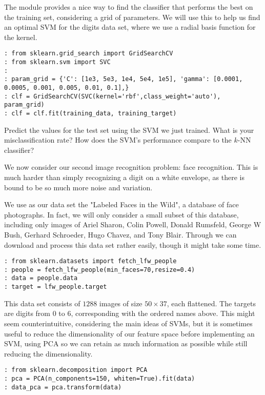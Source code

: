 The module  provides a nice way to find the classifier that performs the best on the training set, considering a grid of parameters. We will use this to help us find an optimal SVM for the digits data set, where we use a radial basis function for the kernel.
\begin{lstlisting}
: from sklearn.grid_search import GridSearchCV
: from sklearn.svm import SVC
:
: param_grid = {'C': [1e3, 5e3, 1e4, 5e4, 1e5], 'gamma': [0.0001, 0.0005, 0.001, 0.005, 0.01, 0.1],}
: clf = GridSearchCV(SVC(kernel='rbf',class_weight='auto'), param_grid)
: clf = clf.fit(training_data, training_target)
\end{lstlisting}

\begin{problem}
Predict the values for the test set using the SVM we just trained. What is your misclassification rate? How does the SVM's performance compare to the $k$-NN classifier?
\end{problem}

We now consider our second image recognition problem: face recognition. This is much harder than simply recognizing a digit on a white envelope, as there is bound to be so much more noise and variation.

We use as our data set the "Labeled Faces in the Wild", a database of face photographs. In fact, we will only consider a small subset of this database, including only images of Ariel Sharon, Colin Powell, Donald Rumsfeld, George W Bush, Gerhard Schroeder, Hugo Chavez, and Tony Blair. Through  we can download and process this data set rather easily, though it might take some time.
\begin{lstlisting}
: from sklearn.datasets import fetch_lfw_people
: people = fetch_lfw_people(min_faces=70,resize=0.4)
: data = people.data
: target = lfw_people.target
\end{lstlisting}

This data set consists of $1288$ images of size $50 \times 37$, each flattened. The targets are digits from $0$ to $6$, corresponding with the ordered names above. This might seem counterintuitive, considering the main ideas of SVMs, but it is sometimes useful to reduce the dimensionality of our feature space before implementing an SVM, using PCA so we can retain as much information as possible while still reducing the dimensionality.
\begin{lstlisting}
: from sklearn.decomposition import PCA
: pca = PCA(n_components=150, whiten=True).fit(data)
: data_pca = pca.transform(data)
\end{lstlisting}

